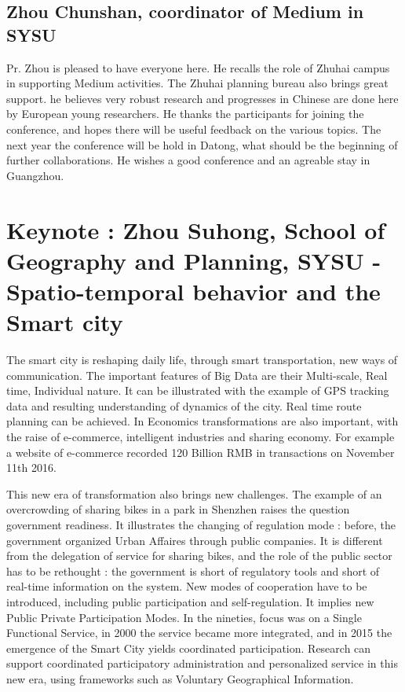 \documentclass[10pt]{article}
\begin{document}
\subsection*{Zhou Chunshan, coordinator of Medium in SYSU}

Pr. Zhou is pleased to have everyone here. He recalls the role of Zhuhai campus in supporting Medium activities. The Zhuhai planning bureau also brings great support.
he believes very robust research and progresses in Chinese are done here by European young researchers. He thanks the participants for joining the conference, and hopes there will be useful feedback on the various topics. The next year the conference will be hold in Datong, what should be the beginning of further collaborations. He wishes a good conference and an agreable stay in Guangzhou.



\section*{Keynote : Zhou Suhong, School of Geography and Planning, SYSU - Spatio-temporal behavior and the Smart city}

The smart city is reshaping daily life, through smart transportation, new ways of communication. The important features of Big Data are their Multi-scale, Real time, Individual nature. It can be illustrated with the example of GPS tracking data and resulting understanding of dynamics of the city. Real time route planning can be achieved. In Economics transformations are also important, with the raise of e-commerce, intelligent industries and sharing economy. For example a website of e-commerce recorded 120 Billion RMB in transactions on November 11th 2016.


This new era of transformation also brings new challenges. The example of an overcrowding of sharing bikes in a park in Shenzhen raises the question government readiness. It illustrates the changing of regulation mode : before, the government organized Urban Affaires through public companies. It is different from the delegation of service for sharing bikes, and the role of the public sector has to be rethought : the government is short of regulatory tools and short of real-time information on the system. New modes of cooperation have to be introduced, including public participation and self-regulation. It implies new Public Private Participation Modes. In the nineties, focus was on a Single Functional Service, in 2000 the service became more integrated, and in 2015 the emergence of the Smart City yields coordinated participation. Research can support coordinated participatory administration and personalized service in this new era, using frameworks such as Voluntary Geographical Information.
\end{document}

